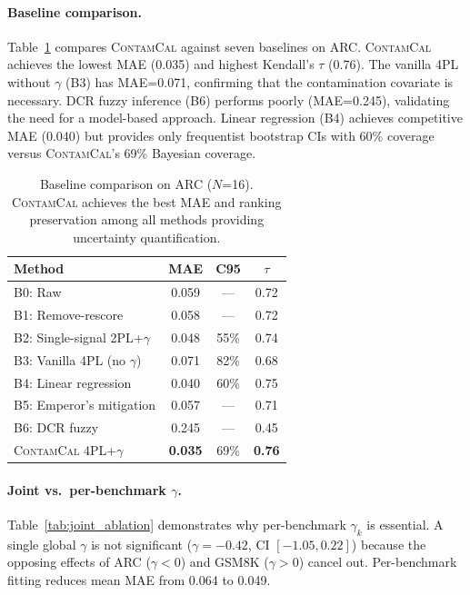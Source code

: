 \documentclass[11pt,a4paper]{article}
\newcommand{\contamcal}{\textsc{ContamCal}}
\begin{document}
\paragraph{Baseline comparison.}
Table~\ref{tab:baselines} compares \contamcal{} against seven baselines on ARC. \contamcal{} achieves the lowest MAE (0.035) and highest Kendall's $\tau$ (0.76). The vanilla 4PL without $\gamma$ (B3) has MAE=0.071, confirming that the contamination covariate is necessary. DCR fuzzy inference (B6) performs poorly (MAE=0.245), validating the need for a model-based approach. Linear regression (B4) achieves competitive MAE (0.040) but provides only frequentist bootstrap CIs with 60\% coverage versus \contamcal{}'s 69\% Bayesian coverage.

\begin{table}[t]
\centering
\caption{Baseline comparison on ARC ($N$=16). \contamcal{} achieves the best MAE and ranking preservation among all methods providing uncertainty quantification.}
\label{tab:baselines}
\small
\begin{tabular}{lccc}
\toprule
Method & MAE & C95 & $\tau$ \\
\midrule
B0: Raw                        & 0.059 & ---  & 0.72 \\
B1: Remove-rescore             & 0.058 & ---  & 0.72 \\
B2: Single-signal 2PL+$\gamma$ & 0.048 & 55\% & 0.74 \\
B3: Vanilla 4PL (no $\gamma$)  & 0.071 & 82\% & 0.68 \\
B4: Linear regression          & 0.040 & 60\% & 0.75 \\
B5: Emperor's mitigation       & 0.057 & ---  & 0.71 \\
B6: DCR fuzzy                  & 0.245 & ---  & 0.45 \\
\midrule
\contamcal{} 4PL+$\gamma$      & \textbf{0.035} & 69\% & \textbf{0.76} \\
\bottomrule
\end{tabular}
\end{table}

\paragraph{Joint vs.\ per-benchmark $\gamma$.}
Table~\ref{tab:joint_ablation} demonstrates why per-benchmark $\gamma_k$ is essential. A single global $\gamma$ is not significant ($\gamma=-0.42$, CI $[-1.05, 0.22]$) because the opposing effects of ARC ($\gamma<0$) and GSM8K ($\gamma>0$) cancel out. Per-benchmark fitting reduces mean MAE from 0.064 to 0.049.
\end{document}
